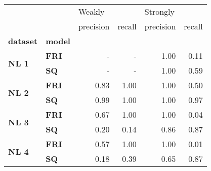 \begin{tabular}{llrrrr}
\toprule
     &    & \multicolumn{2}{l}{Weakly} & \multicolumn{2}{l}{Strongly} \\
     &    & precision & recall & precision & recall \\
\textbf{dataset} & \textbf{model} &           &        &           &        \\
\midrule
\multirow{2}{*}{\textbf{NL 1}} & \textbf{FRI} &         - &      - &      1.00 &   0.11 \\
     & \textbf{SQ} &         - &      - &      1.00 &   0.59 \\
\cline{1-6}
\multirow{2}{*}{\textbf{NL 2}} & \textbf{FRI} &      0.83 &   1.00 &      1.00 &   0.50 \\
     & \textbf{SQ} &      0.99 &   1.00 &      1.00 &   0.97 \\
\cline{1-6}
\multirow{2}{*}{\textbf{NL 3}} & \textbf{FRI} &      0.67 &   1.00 &      1.00 &   0.04 \\
     & \textbf{SQ} &      0.20 &   0.14 &      0.86 &   0.87 \\
\cline{1-6}
\multirow{2}{*}{\textbf{NL 4}} & \textbf{FRI} &      0.57 &   1.00 &      1.00 &   0.01 \\
     & \textbf{SQ} &      0.18 &   0.39 &      0.65 &   0.87 \\
\bottomrule
\end{tabular}
